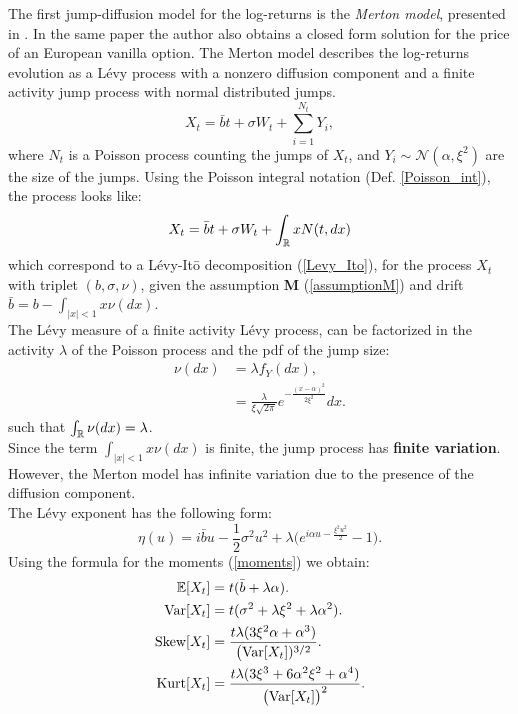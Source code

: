 The first jump-diffusion model for the log-returns is the \emph{Merton model}, presented in 
\cite{Me76}. In the same paper the author also obtains a closed form solution for the price of an European vanilla option. 
The Merton model describes the log-returns evolution as a Lévy process with a nonzero diffusion 
component and a finite activity jump process with normal distributed jumps.
\begin{equation}\label{MertonM}
X_t = \bar b t + \sigma W_t + \sum_{i=1}^{N_t} Y_i, 
\end{equation}
where $N_t$ is a Poisson process counting the jumps of $X_t$, and $Y_i \sim \mathcal{N}(\alpha, \xi^2)$ are the size of the jumps.
Using the Poisson integral notation (Def. \ref{Poisson_int}), the process looks like:
\begin{equation*}
 X_t = \bar b t + \sigma W_t + \int_{\mathbb{R}} x N(t,dx)
\end{equation*}
which correspond to a Lévy-It\={o} decomposition (\ref{Levy_Ito}), for the process $X_t$ with triplet $(b,\sigma,\nu)$, 
given the assumption \textbf{M} (\ref{assumptionM}) and drift
$\bar b = b - \int_{|x|<1} x \nu(dx)$.\\
The Lévy measure of a finite activity Lévy process, can be factorized in the activity $\lambda$ of the Poisson process and 
the pdf of the jump size:
\begin{align*}
 \nu(dx) &= \lambda f_Y(dx), \\
	 &= \frac{\lambda}{\xi \sqrt{2\pi}} e^{- \frac{(x-\alpha)^2}{2\xi^2}} dx.  
\end{align*}
such that $\int_{\mathbb{R}} \nu(dx) = \lambda$.\\
Since the term $\int_{|x|<1} x \nu(dx)$ is finite, the jump process has \textbf{finite variation}. However, 
the Merton model has infinite variation due to the presence of the diffusion component.\\ 
The Lévy exponent has the following form:
\begin{equation}
 \eta(u) = i\bar b u - \frac{1}{2} \sigma^2 u^2 + \lambda \biggl( e^{i\alpha u -\frac{\xi^2 u^2}{2} }-1 \biggr). 
\end{equation}
\newline
Using the formula for the moments (\ref{moments}) we obtain:
\begin{align}\label{Merton_moments}
 \mathbb{E}[X_t] &= t(\bar b+\lambda \alpha). \\ \nonumber
 \mbox{Var}[X_t] &= t(\sigma^2 + \lambda \xi^2 + \lambda \alpha^2). \\ \nonumber
 \mbox{Skew}[X_t] &= \frac{t\lambda (3\xi^2 \alpha + \alpha^3)}{\bigl(\mbox{Var}[X_t])^{3/2}}. \\ \nonumber
 \mbox{Kurt}[X_t] &= \frac{t \lambda (3\xi^3 +6\alpha^2\xi^2 +\alpha^4)}{\bigl(\mbox{Var}[X_t]\bigr)^2}. \nonumber
\end{align} \newline
